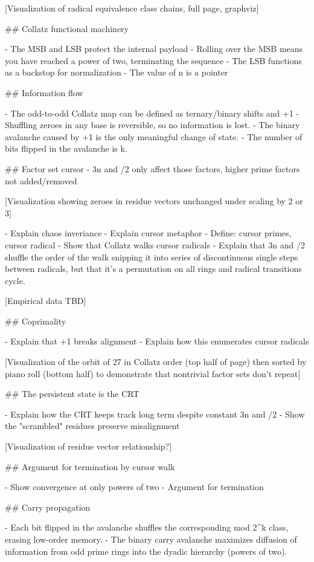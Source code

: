 \documentclass[12pt]{article}
\theoremstyle{plain}
\theoremstyle{definition}
\begin{document}
[Visualization of radical equivalence class chains, full page, graphviz]

## Collatz functional machinery

- The MSB and LSB protect the internal payload
- Rolling over the MSB means you have reached a power of two, terminating the sequence
- The LSB functions as a backstop for normalization
- The value of n is a pointer

## Information flow

- The odd-to-odd Collatz map can be defined as ternary/binary shifts and +1
- Shuffling zeroes in any base is reversible, so no information is lost.
- The binary avalanche caused by +1 is the only meaningful change of state.
- The number of bits flipped in the avalanche is k.


## Factor set cursor
- 3n and /2 only affect those factors, higher prime factors not added/removed

[Visualization showing zeroes in residue vectors unchanged under scaling by 2 or 3]

- Explain chaos inveriance
- Explain cursor metaphor
- Define: cursor primes, cursor radical
- Show that Collatz walks cursor radicals
- Explain that 3n and /2 shuffle the order of the walk snipping it into series of discontinuous single steps between radicals, but that it's a permutation on all rings and radical transitions cycle.

[Empirical data TBD]

## Coprimality

- Explain that +1 breaks alignment
- Explain how this enumerates cursor radicals

[Visualization of the orbit of 27 in Collatz order (top half of page) then sorted by piano roll (bottom half) to demonstrate that nontrivial factor sets don't repeat]

## The persistent state is the CRT

- Explain how the CRT keeps track long term despite constant 3n and /2
- Show the "scrambled" residues preserve misalignment

[Visualization of residue vector relationship?]

## Argument for termination by cursor walk

- Show convergence at only powers of two
- Argument for termination


## Carry propagation

- Each bit flipped in the avalanche shuffles the corresponding mod 2^k class, erasing low-order memory.
- The binary carry avalanche maximizes diffusion of information from odd prime rings into the dyadic hierarchy (powers of two).
\end{document}
